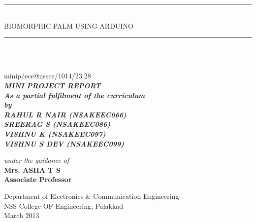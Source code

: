 \documentclass[a4paper, 12pt, notitlepage]{report}
\begin{document}
\begin{titlepage}
\newcommand{\horrule}[1]{\rule{\linewidth}{#1}} 	%
\begin{center}
		\horrule{0.5pt} \\
		\huge BIOMORPHIC PALM USING ARDUINO \\
		\horrule{2pt} \\
		\end{center}
		{\centering
		\vspace{1cm}
		\\minip/ece@nssce/1014/23.28\\
		\vspace{1cm}
\large\bf{\emph{MINI PROJECT REPORT}}\\

\it{As a partial fulfilment of the curriculum}\\
\vspace{0.25cm}
\vspace{0.1cm}
\vspace{1cm}
\it
by \\
\vspace{0.5cm}
\rm
{\large \bf {\emph{RAHUL R NAIR (NSAKEEC066)\\ SREERAG S (NSAKEEC086)\\VISHNU K (NSAKEEC097)\\VISHNU S DEV (NSAKEEC099)}}}\\

\vspace{1.0cm}

{\it{under the guidance of}} \\
\vspace{0.5cm}
\hspace{0.05cm} {\large \bf {Mrs. ASHA T S}}\\
\hspace{0.025cm} {\large \bf {Associate Professor}}\\
\vspace {0.5cm}
\vspace {0.5cm}
\begin{figure}[h]
{\par}
\end{figure}
\begin{center}
Department of Electronics \& Communication Engineering \\
NSS College OF Engineering, Palakkad \\March 2013
\end{center}
}
\end{titlepage}
\end{document}
